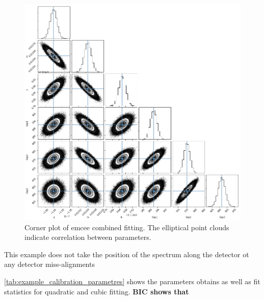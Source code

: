 \begin{figure}
    \centering
    \includegraphics[width=0.5\linewidth]{./figures/appendix/multidetecot_param_fit}
    \caption{Corner plot of emcee combined fitting.
The elliptical point clouds indicate correlation between parameters.}
    \label{fig:multidetecotparamfit}
\end{figure}

This example does not take the  position of the spectrum along the detector ot any detector miss-alignments

\cref{tab:example_calibration_parametres} shows the parameters obtains as well as fit statistics for quadratic and cubic fitting.
\textbf{BIC shows that}

